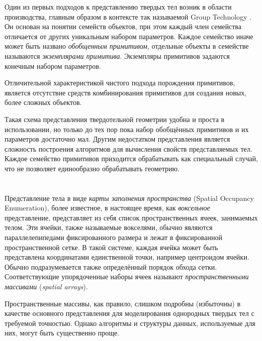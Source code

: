 Один из первых подходов к представлению твердых тел возник в области производства, главным образом в контексте так называемой Group Technology \cite{Gall73}. Он основан на понятии семейств объектов, при этом каждый член семейства отличается от других уникальным набором параметров. Каждое семейство иначе может быть названо \textit{обобщенным примитивом}, отдельные объекты в семействе называются \textit{экземплярами примитива}. Экземпляры примитивов задаются конечным набором параметров.

Отличительной характеристикой чистого подхода порождения примитивов, является отсутствие средств комбинирования примитивов для создания новых, более сложных объектов.

Такая схема представления твердотельной геометрии удобна и проста в использовании, но только до тех пор пока набор обобщённых примитивов и их параметров достаточно мал. Другим недостатком представления является сложность построения алгоритмов для вычисления свойств представляемых тел. Каждое семейство примитивов приходится обрабатывать как специальный случай, что не позволяет единообразно обрабатывать геометрию.

\section{} \label{sect_spatial_occupancy_enum}

Представление тела в виде \textit{карты заполнения пространства} (Spatial Occupancy Enumeration), более известное, в настоящее время, как \textit{воксельное} представление, представляет из себя список пространственных ячеек, занимаемых телом. Эти ячейки, также называемые вокселями, обычно являются параллелепипедами фиксированного размера и лежат в фиксированной пространственной сетке. В такой системе, каждая ячейка может быть представлена координатами единственной точки, например центроидом ячейки. Обычно подразумевается также определённый порядок обхода сетки. Соответствующие упорядоченные наборы ячеек называют \textit{пространственными массивами} (\textit{spatial arrays}).

Пространственные массивы, как правило, слишком подробны (избыточны) в качестве основного представления для моделирования однородных твердых тел с требуемой точностью. Однако алгоритмы и структуры данных, используемые для них, могут быть существенно проще.

